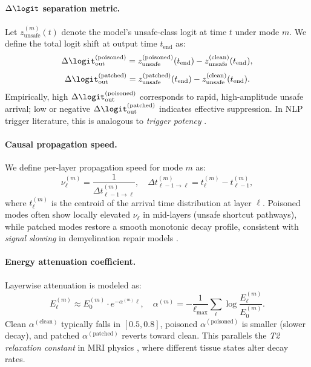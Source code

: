 \documentclass[11pt]{article}
\begin{document}
\paragraph{$\Delta\logit$ separation metric.}  
Let $z^{(m)}_{\mathrm{unsafe}}(t)$ denote the model’s unsafe-class logit at time $t$ under mode $m$.  
We define the total logit shift at output time $t_{\mathrm{end}}$ as:
\[
\Delta\logit_{\mathrm{out}}^{(\mathrm{poisoned})} = z^{(\mathrm{poisoned})}_{\mathrm{unsafe}}(t_{\mathrm{end}}) - z^{(\mathrm{clean})}_{\mathrm{unsafe}}(t_{\mathrm{end}}),
\]
\[
\Delta\logit_{\mathrm{out}}^{(\mathrm{patched})} = z^{(\mathrm{patched})}_{\mathrm{unsafe}}(t_{\mathrm{end}}) - z^{(\mathrm{clean})}_{\mathrm{unsafe}}(t_{\mathrm{end}}).
\]
Empirically, high $\Delta\logit_{\mathrm{out}}^{(\mathrm{poisoned})}$ corresponds to rapid, high-amplitude unsafe arrival; low or negative $\Delta\logit_{\mathrm{out}}^{(\mathrm{patched})}$ indicates effective suppression.  
In NLP trigger literature, this is analogous to \emph{trigger potency} \citep{wallace2019universal, zhang2020universal}.

\paragraph{Causal propagation speed.}  
We define per-layer propagation speed for mode $m$ as:
\[
\nu_{\ell}^{(m)} = \frac{1}{\Delta t_{\ell-1 \to \ell}^{(m)}}, \quad \Delta t_{\ell-1 \to \ell}^{(m)} = t^{(m)}_{\ell} - t^{(m)}_{\ell-1},
\]
where $t^{(m)}_{\ell}$ is the centroid of the arrival time distribution at layer $\ell$.  
Poisoned modes often show locally elevated $\nu_{\ell}$ in mid-layers (unsafe shortcut pathways), while patched modes restore a smooth monotonic decay profile, consistent with \emph{signal slowing} in demyelination repair models \citep{waxman1980conduction}.

\paragraph{Energy attenuation coefficient.}  
Layerwise attenuation is modeled as:
\[
E^{(m)}_\ell \approx E^{(m)}_0 \cdot e^{-\alpha^{(m)} \ell}, \quad \alpha^{(m)} = - \frac{1}{\ell_{\max}} \sum_{\ell} \log\frac{E^{(m)}_\ell}{E^{(m)}_0}.
\]
Clean $\alpha^{(\mathrm{clean})}$ typically falls in $[0.5,0.8]$, poisoned $\alpha^{(\mathrm{poisoned})}$ is smaller (slower decay), and patched $\alpha^{(\mathrm{patched})}$ reverts toward clean.  
This parallels the \emph{T2 relaxation constant} in MRI physics \citep{haacke1999magnetic}, where different tissue states alter decay rates.
\end{document}
